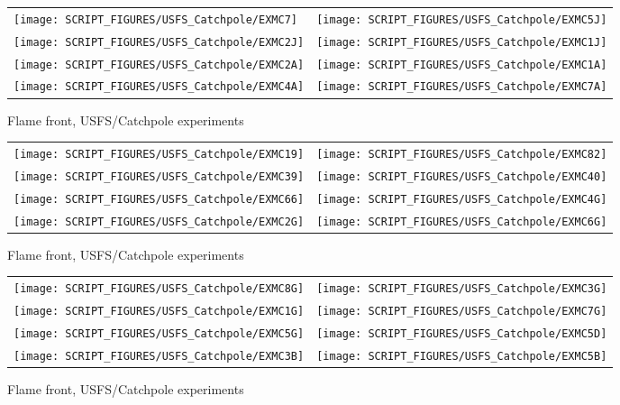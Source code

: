 \begin{figure}[p]
\begin{tabular*}{\textwidth}{l@{\extracolsep{\fill}}r}
\texttt{[image: SCRIPT\_FIGURES/USFS\_Catchpole/EXMC7]} &
\texttt{[image: SCRIPT\_FIGURES/USFS\_Catchpole/EXMC5J]} \\
\texttt{[image: SCRIPT\_FIGURES/USFS\_Catchpole/EXMC2J]} &
\texttt{[image: SCRIPT\_FIGURES/USFS\_Catchpole/EXMC1J]} \\
\texttt{[image: SCRIPT\_FIGURES/USFS\_Catchpole/EXMC2A]} &
\texttt{[image: SCRIPT\_FIGURES/USFS\_Catchpole/EXMC1A]} \\
\texttt{[image: SCRIPT\_FIGURES/USFS\_Catchpole/EXMC4A]} &
\texttt{[image: SCRIPT\_FIGURES/USFS\_Catchpole/EXMC7A]} \\
\end{tabular*}
\caption[Flame front, USFS/Catchpole experiments]{Flame front, USFS/Catchpole experiments}
\label{USFS_Catchpole_304}
\end{figure}

\begin{figure}[p]
\begin{tabular*}{\textwidth}{l@{\extracolsep{\fill}}r}
\texttt{[image: SCRIPT\_FIGURES/USFS\_Catchpole/EXMC19]} &
\texttt{[image: SCRIPT\_FIGURES/USFS\_Catchpole/EXMC82]} \\
\texttt{[image: SCRIPT\_FIGURES/USFS\_Catchpole/EXMC39]} &
\texttt{[image: SCRIPT\_FIGURES/USFS\_Catchpole/EXMC40]} \\
\texttt{[image: SCRIPT\_FIGURES/USFS\_Catchpole/EXMC66]} &
\texttt{[image: SCRIPT\_FIGURES/USFS\_Catchpole/EXMC4G]} \\
\texttt{[image: SCRIPT\_FIGURES/USFS\_Catchpole/EXMC2G]} &
\texttt{[image: SCRIPT\_FIGURES/USFS\_Catchpole/EXMC6G]} \\
\end{tabular*}
\caption[Flame front, USFS/Catchpole experiments]{Flame front, USFS/Catchpole experiments}
\label{USFS_Catchpole_312}
\end{figure}

\begin{figure}[p]
\begin{tabular*}{\textwidth}{l@{\extracolsep{\fill}}r}
\texttt{[image: SCRIPT\_FIGURES/USFS\_Catchpole/EXMC8G]} &
\texttt{[image: SCRIPT\_FIGURES/USFS\_Catchpole/EXMC3G]} \\
\texttt{[image: SCRIPT\_FIGURES/USFS\_Catchpole/EXMC1G]} &
\texttt{[image: SCRIPT\_FIGURES/USFS\_Catchpole/EXMC7G]} \\
\texttt{[image: SCRIPT\_FIGURES/USFS\_Catchpole/EXMC5G]} &
\texttt{[image: SCRIPT\_FIGURES/USFS\_Catchpole/EXMC5D]} \\
\texttt{[image: SCRIPT\_FIGURES/USFS\_Catchpole/EXMC3B]} &
\texttt{[image: SCRIPT\_FIGURES/USFS\_Catchpole/EXMC5B]} \\
\end{tabular*}
\caption[Flame front, USFS/Catchpole experiments]{Flame front, USFS/Catchpole experiments}
\label{USFS_Catchpole_320}
\end{figure}


